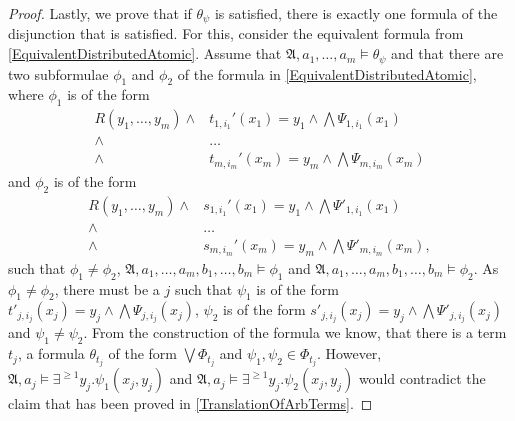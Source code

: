 \begin{proof}
	Lastly, we prove that if $\theta_\psi$ is satisfied, there is exactly one formula of the disjunction that is satisfied.
	For this, consider the equivalent formula from \cref{EquivalentDistributedAtomic}.
	Assume that $\mathfrak A,a_1,\dots,a_m\models \theta_\psi$ and that there are two subformulae $\phi_1$ and $\phi_2$ of the formula in \cref{EquivalentDistributedAtomic}, where $\phi_1$ is of the form 
	\begin{align*}
		R(y_1,\dots,y_m)\land & t_{1,i_1}'(x_1)=y_1 \land \bigwedge\Psi_{1,i_1}(x_1) \\
		\land & \dots \\
		\land & t_{m,i_m}'(x_m)=y_m \land \bigwedge\Psi_{m,i_m}(x_m)
	\end{align*}
	and $\phi_2$ is of the form
	\begin{align*}
		R(y_1,\dots,y_m)\land & s_{1,i_1}'(x_1)=y_1 \land \bigwedge\Psi'_{1,i_1}(x_1) \\
		\land & \dots \\
		\land & s_{m,i_m}'(x_m)=y_m \land \bigwedge\Psi'_{m,i_m}(x_m),
	\end{align*}
	such that $\phi_1\neq\phi_2$, $\mathfrak A,a_1,\dots,a_m,b_1,\dots,b_m\models \phi_1$ and $\mathfrak A,a_1,\dots,a_m,b_1,\dots,b_m\models \phi_2$.
	As $\phi_1\neq \phi_2$, there must be a $j$ such that $\psi_1$ is of the form $t'_{j,i_j}(x_j)=y_j\land \bigwedge \Psi_{j,i_j}(x_j)$, $\psi_2$ is of the form $s'_{j,i_j}(x_j)=y_j\land\bigwedge \Psi'_{j,i_j}(x_j)$ and $\psi_1\neq\psi_2$.
	From the construction of the formula we know, that there is a term $t_j$, a formula $\theta_{t_j}$ of the form $\bigvee \Phi_{t_j}$ and $\psi_1,\psi_2\in\Phi_{t_j}$.
	However, $\mathfrak A,a_j\models \exists^{\geq 1}y_j . \psi_1(x_j,y_j)$ and $\mathfrak A,a_j\models \exists^{\geq 1}y_j.\psi_2(x_j,y_j)$ would contradict the claim that has been proved in \cref{TranslationOfArbTerms}.
\end{proof}

